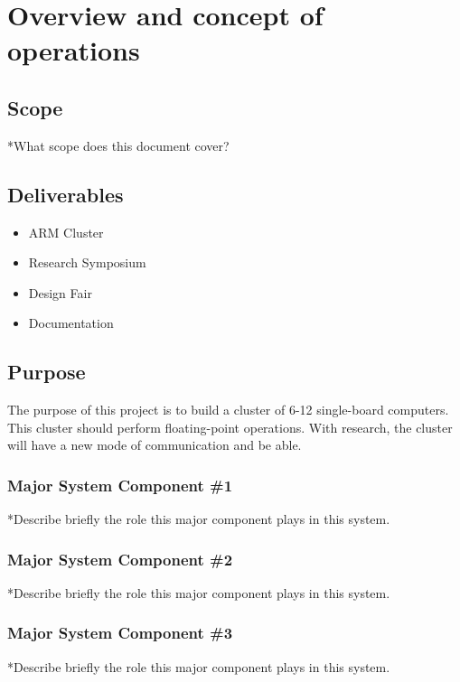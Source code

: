 
\chapter{Overview and concept of operations}



\section{Scope}
*What scope does this document cover? 

\section{Deliverables}
\begin{itemize}
	\item ARM Cluster
	\item Research Symposium
	\item Design Fair
	\item Documentation
\end{itemize}

\section{Purpose}
The purpose of this project is to build a cluster of 6-12 single-board computers. This cluster should perform floating-point operations. With research, the cluster will have a new mode of communication and be able.

\subsection{Major System Component \#1}
*Describe briefly the role this major component plays in this system. 

\subsection{Major System Component \#2}
*Describe briefly the role this major component plays in this system. 

\subsection{Major System Component \#3}
*Describe briefly the role this major component plays in this system. 

